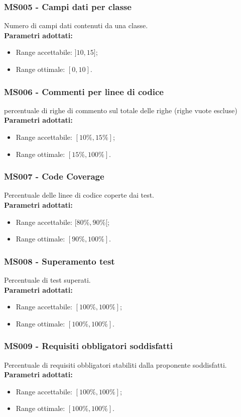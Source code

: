 \subsubsection{MS005 - Campi dati per classe}\mbox{}
Numero di campi dati contenuti da una classe. \\[0,2cm]
\textbf{Parametri adottati:}
\begin{itemize}
	\item Range accettabile: $ ]10,15]$;
	\item Range ottimale: $[0,10]$.
\end{itemize}

\subsubsection{MS006 - Commenti per linee di codice}\mbox{}
percentuale di righe di commento sul totale delle righe (righe vuote escluse) \\[0,2cm]
\textbf{Parametri adottati:}
\begin{itemize}
	\item Range accettabile: $[10\%,15\%]$;
	\item Range ottimale: $[15\%,100\%]$.
\end{itemize}

\subsubsection{MS007 - Code Coverage}\mbox{}
Percentuale delle linee di codice coperte dai test.\\[0,2cm]
\textbf{Parametri adottati:}
\begin{itemize}
	\item Range accettabile: $[80\%,90\%[$;
	\item Range ottimale: $[90\%,100\%]$.
\end{itemize}
\subsubsection{MS008 - Superamento test}\mbox{}
Percentuale di test superati. \\[0,2cm]
\textbf{Parametri adottati:}
\begin{itemize}
	\item Range accettabile: $[100\%,100\%]$;
	\item Range ottimale: $[100\%,100\%]$.
\end{itemize}

\subsubsection{MS009 - Requisiti obbligatori soddisfatti}\mbox{}
Percentuale di requisiti obbligatori stabiliti dalla proponente soddisfatti.\\[0,2cm]
\textbf{Parametri adottati:}
\begin{itemize}
	\item Range accettabile: $[100\%,100\%]$;
	\item Range ottimale: $[100\%,100\%]$.
\end{itemize}
	
